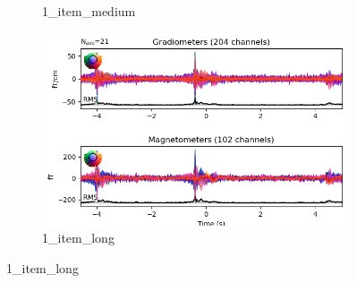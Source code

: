 \begin{figure}[htb]
\begin{subfigure}{0.25\textwidth}
        \caption{1\_item\_medium}
        \label{fig:1_item_medium}
    \end{subfigure}\hfil %
    \begin{subfigure}{0.25\textwidth}
        \includegraphics[width=\linewidth]{images_report/sensor/evoked/1_item_long.png}
        \caption{1\_item\_long}
        \label{fig:1_item_long}
    \end{subfigure}


\end{figure}
